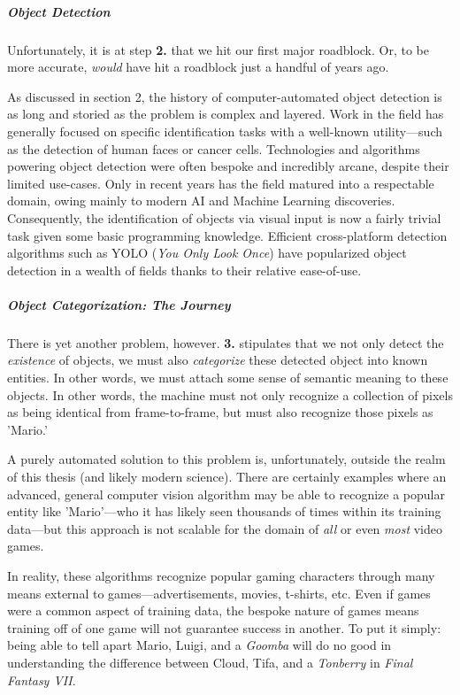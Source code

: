 \documentclass{report}
\begin{document}
\subparagraph{Object Detection}
Unfortunately, it is at step \textbf{2.} that we hit our first major roadblock. Or, to be more accurate, \emph{would} have hit a roadblock just a handful of years ago. 

As discussed in section 2, the history of computer-automated object detection is as long and storied as the problem is complex and layered. Work in the field has generally focused on specific identification tasks with a well-known utility---such as the detection of human faces or cancer cells. Technologies and algorithms powering object detection were often bespoke and incredibly arcane, despite their limited use-cases. Only in recent years has the field matured into a respectable domain, owing mainly to modern AI and Machine Learning discoveries. Consequently, the identification of objects via visual input is now a fairly trivial task given some basic programming knowledge. Efficient cross-platform detection algorithms such as YOLO (\emph{You Only Look Once}) have popularized object detection in a wealth of fields thanks to their relative ease-of-use\cite{wang2022yolov7trainablebagoffreebiessets}. 

\subparagraph{Object Categorization: \emph{The Journey}}
There is yet another problem, however. \textbf{3.} stipulates that we not only detect the \emph{existence} of objects, we must also \emph{categorize} these detected object into known entities. In other words, we must attach some sense of semantic meaning to these objects. In other words, the machine must not only recognize a collection of pixels as being identical from frame-to-frame, but must also recognize those pixels as 'Mario.' 

A purely automated solution to this problem is, unfortunately, outside the realm of this thesis (and likely modern science). There are certainly examples where an advanced, general computer vision algorithm may be able to recognize a popular entity like 'Mario'---who it has likely seen thousands of times within its training data---but this approach is not scalable for the domain of \emph{all} or even \emph{most} video games. 

In reality, these algorithms recognize popular gaming characters through many means external to games---advertisements, movies, t-shirts, etc. Even if games were a common aspect of training data, the bespoke nature of games means training off of one game will not guarantee success in another. To put it simply: being able to tell apart Mario, Luigi, and a \emph{Goomba} will do no good in understanding the difference between Cloud, Tifa, and a \emph{Tonberry} in \emph{Final Fantasy VII}.
\end{document}

